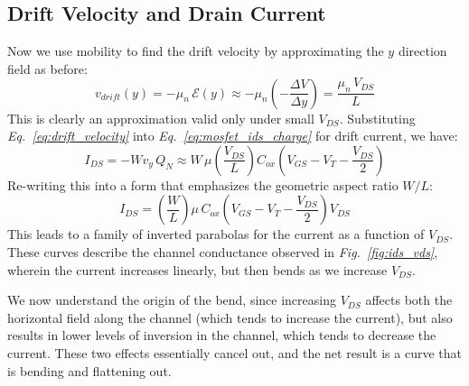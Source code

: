 \subsection{Drift Velocity and Drain Current}
Now we use mobility to find the drift velocity by approximating the $y$ direction field as before:
    \begin{equation}
        v_{drift}(y) = -\mu_n\,\mathcal{E}(y) \approx -\mu_n \left(-\frac{\Delta V}{\Delta y}\right)
        = \frac{\mu_n\,V_{DS}}{L}
        \label{eq:drift_velocity}
    \end{equation}
This is clearly an approximation valid only under small $V_{DS}$.  Substituting \emph{Eq.~\ref{eq:drift_velocity}} into \emph{Eq.~\ref{eq:mosfet_ids_charge}} for drift current, we have:
    \begin{equation}
        I_{DS} = -W v_y\,Q_N \approx W\,\mu \left(\frac{V_{DS}}{L}\right)C_{ox} \left(V_{GS} - V_T - \frac{V_{DS}}{2}\right)
    \end{equation}
Re-writing this into a form that emphasizes the geometric aspect ratio $W/L$:
    \begin{equation}
        I_{DS} = \left(\frac{W}{L}\right) \mu\,C_{ox} \left(V_{GS} - V_T - \frac{V_{DS}}{2}\right)V_{DS}
    \end{equation}
This leads to a family of inverted parabolas for the current as a function of $V_{DS}$.  These curves describe the channel conductance observed in \emph{Fig.~\ref{fig:ids_vds}}, wherein the current increases linearly, but then bends as we increase $V_{DS}$.

We now understand the origin of the bend, since increasing $V_{DS}$ affects both the horizontal field along the channel (which tends to increase the current), but also results in lower levels of inversion in the channel, which tends to decrease the current.  These two effects essentially cancel out, and the net result is a curve that is bending and flattening out.
